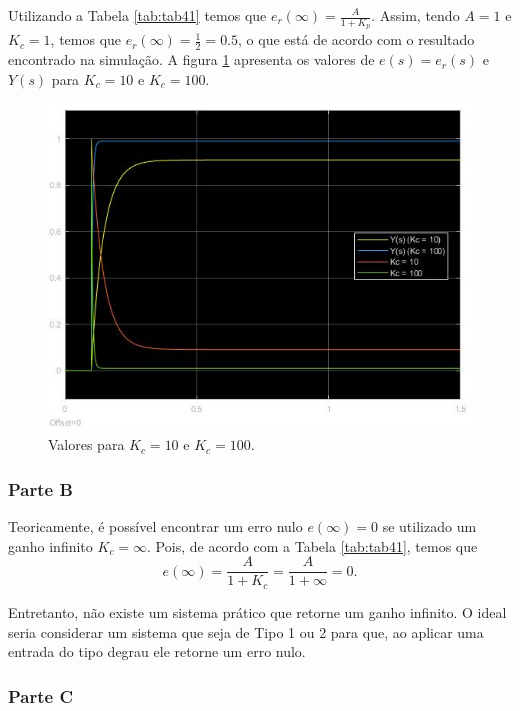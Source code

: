\documentclass[
]{book}
\theoremstyle{definition}
\theoremstyle{definition}
\theoremstyle{definition}
\theoremstyle{remark}
\begin{document}
Utilizando a Tabela \ref{tab:tab41} temos que \(e_r(\infty)=\frac{A}{1 + K_p}\). Assim, tendo \(A = 1\) e \(K_c = 1\), temos que \(e_r(\infty) = \frac {1}{2} = 0.5\), o que está de acordo com o resultado encontrado na simulação. A figura \ref{fig:fig41A2} apresenta os valores de \(e(s) = e_r(s)\) e \(Y(s)\) para \(K_c = 10\) e \(K_c = 100\).

\begin{figure}
\includegraphics[width=0.8\linewidth]{Imagens/Lab4/Resolução/prob1A2} \caption{Valores para $K_c = 10$ e $K_c = 100$.}\label{fig:fig41A2}
\end{figure}

\hypertarget{parte-b-1}{%
\subsubsection*{Parte B}\label{parte-b-1}}

Teoricamente, é possível encontrar um erro nulo \(e(\infty) = 0\) se utilizado um ganho infinito \(K_c = \infty\). Pois, de acordo com a Tabela \ref{tab:tab41}, temos que
\[
e(\infty) = \frac {A}{1+K_c} = \frac {A}{1+\infty} = 0.
\]

Entretanto, não existe um sistema prático que retorne um ganho infinito. O ideal seria considerar um sistema que seja de Tipo 1 ou 2 para que, ao aplicar uma entrada do tipo degrau ele retorne um erro nulo.

\hypertarget{parte-c}{%
\subsubsection*{Parte C}\label{parte-c}}
\end{document}
